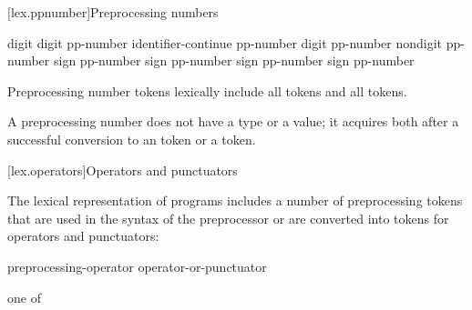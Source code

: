[lex.ppnumber]{Preprocessing numbers}

%
\begin{bnf}
\br
    digit\br
     digit\br
    pp-number identifier-continue\br
    pp-number  digit\br
    pp-number  nondigit\br
    pp-number  sign\br
    pp-number  sign\br
    pp-number  sign\br
    pp-number  sign\br
    pp-number 
\end{bnf}

\pnum
Preprocessing number tokens lexically include
all  tokens and
all  tokens.

\pnum
A preprocessing number does not have a type or a value; it acquires both
after a successful conversion to
an  token or
a  token.%

[lex.operators]{Operators and punctuators}

\pnum
{}%
%
The lexical representation of \Cpp{} programs includes a number of
preprocessing tokens that are used in the syntax of the preprocessor or
are converted into tokens for operators and punctuators:

\begin{bnf}
\br
    preprocessing-operator\br
    operator-or-punctuator
\end{bnf}

\begin{bnf}
 \textnormal{one of}\br
    \terminal{\# \ \ \ \ \ \ \ \#\# \ \ \ \ \ \ \%: \ \ \ \ \ \ \%:\%:}
\end{bnf}


